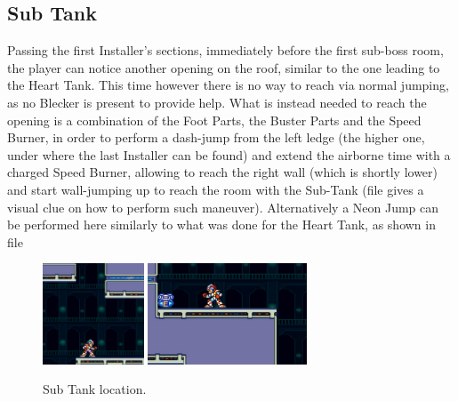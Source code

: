 \subsection{Sub Tank}
Passing the first Installer's sections, immediately before the first sub-boss room, the player can notice another opening on the roof, similar to the one leading to the Heart Tank. This time however there is no way to reach via normal jumping, as no Blecker is present to provide help. What is instead needed to reach the opening is a combination of the Foot Parts, the Buster Parts and the Speed Burner, in order to perform a dash-jump from the left ledge (the higher one, under where the last Installer can be found) and extend the airborne time with a charged Speed Burner, allowing to reach the right wall (which is shortly lower) and start wall-jumping up to reach the room with the Sub-Tank (file  gives a visual clue on how to perform such maneuver). Alternatively a Neon Jump can be performed here similarly to what was done for the Heart Tank, as shown in file 

\begin{figure}[htp]
	\centering
	\includegraphics[height=3cm]{figures/X2/Magna_centipede/Centipede_tank_1.png}
	\includegraphics[height=3cm]{figures/X2/Magna_centipede/Centipede_tank.png}
	\caption{Sub Tank location.}
\end{figure}

